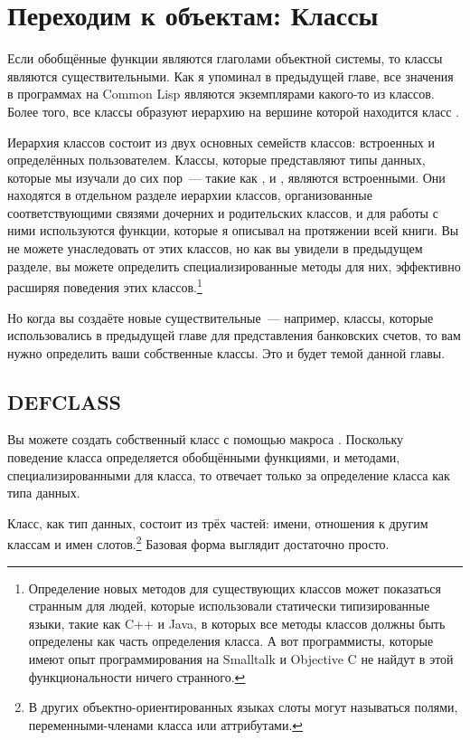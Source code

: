 \chapter{Переходим к объектам: Классы}
\label{ch:17}

Если обобщённые функции являются глаголами объектной системы, то классы являются
существительными.  Как я упоминал в предыдущей главе, все значения в программах на Common
Lisp являются экземплярами какого-то из классов.  Более того, все классы образуют иерархию
на вершине которой находится класс .

Иерархия классов состоит из двух основных семейств классов: встроенных и определённых
пользователем.  Классы, которые представляют типы данных, которые мы изучали до сих
пор~--- такие как ,  и , являются встроенными.  Они
находятся в отдельном разделе иерархии классов, организованные соответствующими связями
дочерних и родительских классов, и для работы с ними используются функции, которые я
описывал на протяжении всей книги.  Вы не можете унаследовать от этих классов, но как вы
увидели в предыдущем разделе, вы можете определить специализированные методы для них,
эффективно расширяя поведения этих классов.\footnote{Определение новых методов для
    существующих классов может показаться странным для людей, которые использовали
    статически типизированные языки, такие как C++ и Java, в которых все методы классов
    должны быть определены как часть определения класса.  А вот программисты, которые
    имеют опыт программирования на Smalltalk и Objective C не найдут в этой
функциональности ничего странного.}

Но когда вы создаёте новые существительные~--- например, классы, которые использовались в
предыдущей главе для представления банковских счетов, то вам нужно определить ваши
собственные классы.  Это и будет темой данной главы.

\section{DEFCLASS}

Вы можете создать собственный класс с помощью макроса .  Поскольку
поведение класса определяется обобщёнными функциями, и методами, специализированными для
класса, то  отвечает только за определение класса как типа данных.

Класс, как тип данных, состоит из трёх частей: имени, отношения к другим классам и имен
слотов.\footnote{В других объектно-ориентированных языках слоты могут называться полями,
переменными-членами класса или аттрибутами.}  Базовая форма  выглядит
достаточно просто.

